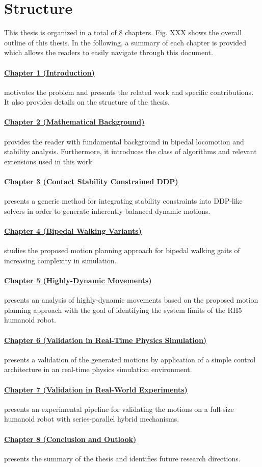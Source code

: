 \section{Structure}
This thesis is organized in a total of 8 chapters. Fig. XXX shows the overall outline of this thesis. In the following, a summary of each chapter is provided which allows the readers to easily navigate through this document.
\paragraph{\hyperref[c1]{Chapter 1 (Introduction)}} motivates the problem and presents the related work and specific contributions. It also provides details on the structure of the thesis.
\paragraph{\hyperref[c2]{Chapter 2 (Mathematical Background)}} provides the reader with fundamental background in bipedal locomotion and stability analysis. Furthermore, it introduces the class of algorithms and relevant extensions used in this work.
\paragraph{\hyperref[c3]{Chapter 3 (Contact Stability Constrained DDP)}} presents a generic method for integrating stability constraints into DDP-like solvers in order to generate inherently balanced dynamic motions.
\paragraph{\hyperref[c4]{Chapter 4 (Bipedal Walking Variants)}} studies the proposed motion planning approach for bipedal walking gaits of increasing complexity in simulation.
\paragraph{\hyperref[c5]{Chapter 5 (Highly-Dynamic Movements)}} presents an analysis of highly-dynamic movements based on the proposed motion planning approach with the goal of identifying the system limits of the RH5 humanoid robot. 
\paragraph{\hyperref[c6]{Chapter 6 (Validation in Real-Time Physics Simulation)}} presents a validation of the generated motions by application of a simple control architecture in an real-time physics simulation environment. 
\paragraph{\hyperref[c7]{Chapter 7 (Validation in Real-World Experiments)}} presents an experimental pipeline for validating the motions on a full-size humanoid robot with series-parallel hybrid mechanisms. 
\paragraph{\hyperref[c8]{Chapter 8 (Conclusion and Outlook)}} presents the summary of the thesis and identifies future research directions. 


